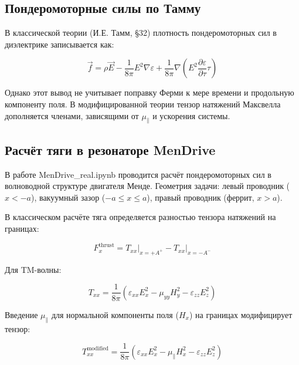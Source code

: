 \documentclass[12pt, a4paper]{article}
\begin{document}
\subsection{Пондеромоторные силы по Тамму}

В классической теории (И.Е. Тамм, §32) плотность пондеромоторных сил в диэлектрике записывается как:

\begin{equation}
\vec{f} = \rho \vec{E} - \frac{1}{8\pi} E^2 \nabla \varepsilon + \frac{1}{8\pi} \nabla \left( E^2 \frac{\partial \varepsilon}{\partial \tau} \tau \right)
\label{eq:ponderomotive_tamm}
\end{equation}

Однако этот вывод не учитывает поправку Ферми к мере времени и продольную компоненту поля. В модифицированной теории тензор натяжений Максвелла дополняется членами, зависящими от $\mu_{\parallel}$ и ускорения системы.

\subsection{Расчёт тяги в резонаторе MenDrive}

В работе MenDrive\_real.ipynb проводится расчёт пондеромоторных сил в волноводной структуре двигателя Менде. Геометрия задачи: левый проводник ($x < -a$), вакуумный зазор ($-a \le x \le a$), правый проводник (феррит, $x > a$).

В классическом расчёте тяга определяется разностью тензора натяжений на границах:

\begin{equation}
F_x^{\text{thrust}} = T_{xx}\big|_{x=+A^+} - T_{xx}\big|_{x=-A^-}
\label{eq:thrust_force_full}
\end{equation}

Для TM-волны:

\begin{equation}
T_{xx} = \frac{1}{8\pi} \left( \varepsilon_{xx} E_x^2 - \mu_{yy} H_y^2 - \varepsilon_{zz} E_z^2 \right)
\label{eq:stress_tensor_tm}
\end{equation}

Введение $\mu_{\parallel}$ для нормальной компоненты поля ($H_x$) на границах модифицирует тензор:

\begin{equation}
T_{xx}^{\text{modified}} = \frac{1}{8\pi} \left( \varepsilon_{xx} E_x^2 - \mu_{\parallel} H_x^2 - \varepsilon_{zz} E_z^2 \right)
\label{eq:stress_tensor_modified_full}
\end{equation}
\end{document}
